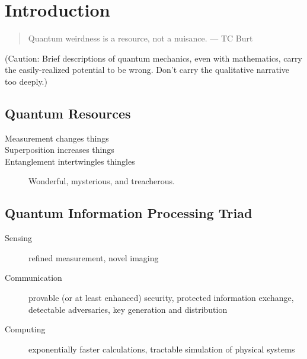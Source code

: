 
\section*{Introduction}
\begin{quote}
  Quantum weirdness is a resource, not a nuisance. --- TC Burt
\end{quote}

(Caution: Brief descriptions of quantum mechanics, even with mathematics,
carry the easily-realized potential to be wrong. Don't carry the qualitative
narrative too deeply.)

\subsection*{Quantum Resources}
\begin{description}
\item[Measurement changes things]
\item[Superposition increases things] 
\item[Entanglement intertwingles thingles] \bcsmbh Wonderful, \bcquestion mysterious, and \bcdanger treacherous. 
\end{description}


\subsection*{Quantum Information Processing Triad}
\begin{description}
\item[Sensing] refined measurement, novel imaging
\item[Communication] provable (or at least enhanced) security, protected
  information exchange, detectable adversaries, key generation and distribution
\item[Computing] exponentially faster calculations, tractable simulation of
  physical systems
\end{description}

